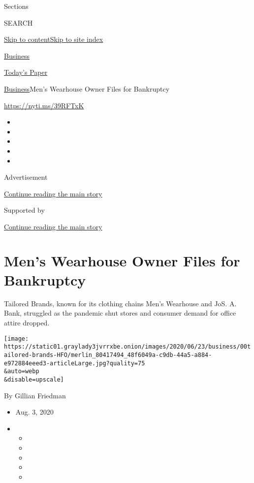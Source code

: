 Sections

SEARCH

\protect\hyperlink{site-content}{Skip to
content}\protect\hyperlink{site-index}{Skip to site index}

\href{https://www.nytimes3xbfgragh.onion/section/business}{Business}

\href{https://myaccount.nytimes3xbfgragh.onion/auth/login?response_type=cookie\&client_id=vi}{}

\href{https://www.nytimes3xbfgragh.onion/section/todayspaper}{Today's
Paper}

\href{/section/business}{Business}\textbar{}Men's Wearhouse Owner Files
for Bankruptcy

\href{https://nyti.ms/39RFTxK}{https://nyti.ms/39RFTxK}

\begin{itemize}
\item
\item
\item
\item
\item
\end{itemize}

Advertisement

\protect\hyperlink{after-top}{Continue reading the main story}

Supported by

\protect\hyperlink{after-sponsor}{Continue reading the main story}

\hypertarget{mens-wearhouse-owner-files-for-bankruptcy}{%
\section{Men's Wearhouse Owner Files for
Bankruptcy}\label{mens-wearhouse-owner-files-for-bankruptcy}}

Tailored Brands, known for its clothing chains Men's Wearhouse and JoS.
A. Bank, struggled as the pandemic shut stores and consumer demand for
office attire dropped.

\texttt{[image: https://static01.graylady3jvrrxbe.onion/images/2020/06/23/business/00tailored-brands-HFO/merlin\_80417494\_48f6049a-c9db-44a5-a884-e972884eeed3-articleLarge.jpg?quality=75\\\&auto=webp\\\&disable=upscale]}

By Gillian Friedman

\begin{itemize}
\item
  Aug. 3, 2020
\item
  \begin{itemize}
  \item
  \item
  \item
  \item
  \item
  \end{itemize}
\end{itemize}

